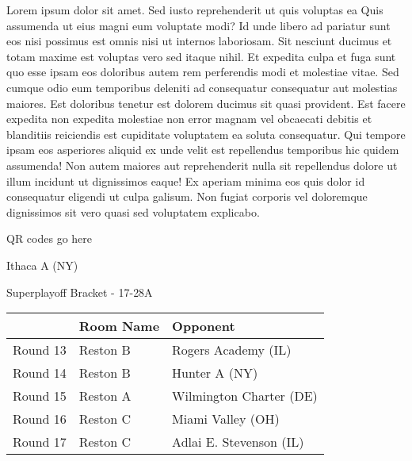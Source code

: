 \documentclass{article}%
\begin{document}
\vspace*{8pt}%
\linebreak%
\newline%
\newline%
Lorem ipsum dolor sit amet. Sed iusto reprehenderit ut quis voluptas ea Quis assumenda ut eius magni eum voluptate modi? Id unde libero ad pariatur sunt eos nisi possimus est omnis nisi ut internos laboriosam. Sit nesciunt ducimus et totam maxime est voluptas vero sed itaque nihil. Et expedita culpa et fuga sunt quo esse ipsam eos doloribus autem rem perferendis modi et molestiae vitae.\newline%
\newline%
Sed cumque odio eum temporibus deleniti ad consequatur consequatur aut molestias maiores. Est doloribus tenetur est dolorem ducimus sit quasi provident. Est facere expedita non expedita molestiae non error magnam vel obcaecati debitis et blanditiis reiciendis est cupiditate voluptatem ea soluta consequatur. Qui tempore ipsam eos asperiores aliquid ex unde velit est repellendus temporibus hic quidem assumenda!\newline%
\newline%
Non autem maiores aut reprehenderit nulla sit repellendus dolore ut illum incidunt ut dignissimos eaque! Ex aperiam minima eos quis dolor id consequatur eligendi ut culpa galisum. Non fugiat corporis vel doloremque dignissimos sit vero quasi sed voluptatem explicabo.\newline%
\newline%
%
\vspace*{30pt}%
\begin{center}%
\begin{Huge}%
QR codes go here%
\end{Huge}%
\end{center}%
\newpage%
\begin{center}%
\begin{Huge}%
Ithaca A (NY)%
\end{Huge}%
\vspace*{8pt}%
\linebreak%
\begin{Large}%
Superplayoff Bracket {-} 17{-}28A%
\end{Large}%
\end{center}%
%
\begin{tabularx}{\textwidth}{|c|Y|Y|}%
\hline%
&Room Name&Opponent\\%
\hline%
Round 13&Reston B&Rogers Academy (IL)\\%
Round 14&Reston B&Hunter A (NY)\\%
Round 15&Reston A&Wilmington Charter (DE)\\%
Round 16&Reston C&Miami Valley (OH)\\%
Round 17&Reston C&Adlai E. Stevenson (IL)\\%
\hline%
\end{tabularx}%
\end{document}

